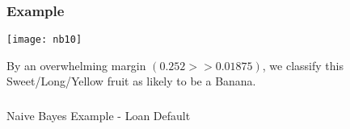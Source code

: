 \begin{frame}[fragile]\frametitle{Example}
\begin{center}
\texttt{[image: nb10]}
\end{center}
By an overwhelming margin $(0.252 >> 0.01875)$, we classify this Sweet/Long/Yellow fruit as likely to be a Banana.
 \end{frame}


%
%

\begin{frame}[fragile]\frametitle{}
\begin{center}
{\Large Naive Bayes Example - Loan Default}
\end{center}
\end{frame}

